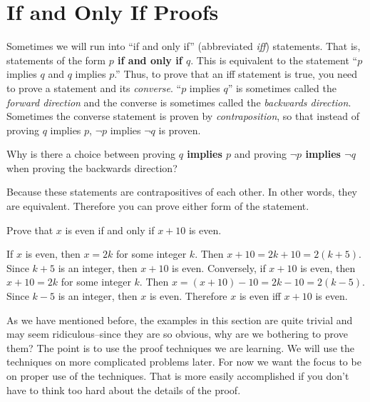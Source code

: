 \section{If and Only If Proofs}\label{section:iff}

Sometimes we will run into ``if and only if''  (abbreviated {\em iff}) statements.
That is, statements of the form  {\bf  $p$ if and only if $q$}.
This is equivalent to the statement ``$p$ implies $q$ and $q$ implies $p$.''
Thus, to prove that an iff statement is true, you need to prove a statement and
its {\em converse}.
``$p$ implies $q$'' is sometimes called the {\em forward direction} and the converse
is sometimes called the {\em backwards direction}.
Sometimes the converse statement is proven by {\em contraposition},
so that instead of proving $q$ implies $p$, $\neg p$ implies $\neg q$ is proven.

\begin{ques}
Why is there a choice between proving {\bf $q$ implies $p$} and proving {\bf $\neg p$ implies $\neg q$} when proving the backwards direction?\\
\answerlinetwo
\begin{answer}
Because these statements are contrapositives of each other.  In other words, they are equivalent.
Therefore you can prove either form of the statement.
\end{answer}
\end{ques}

\begin{exa}
Prove that $x$ is even if and only if $x+10$ is even.
\begin{pf}
If $x$ is even, then $x=2k$ for some integer $k$. 
Then $x+10=2k+10=2(k+5)$.  Since $k+5$ is an integer, then 
$x+10$ is even.  
Conversely, if $x+10$ is even, then $x+10=2k$ for some integer $k$.  
Then $x=(x+10)-10=2k-10=2(k-5)$.  Since $k-5$ is an integer, then $x$ is even.
Therefore $x$ is even iff $x+10$ is even.
\end{pf}
\end{exa}

As we have mentioned before, the examples in this section are quite trivial and may seem
ridiculous--since they are so obvious, why are we bothering to prove them?  The point is
to use the proof techniques we are learning.  We will use the techniques on more complicated
problems later.  For now we want the focus to be on proper use of the techniques.  That is
more easily accomplished if you don't have to think too hard about the details of the proof.

